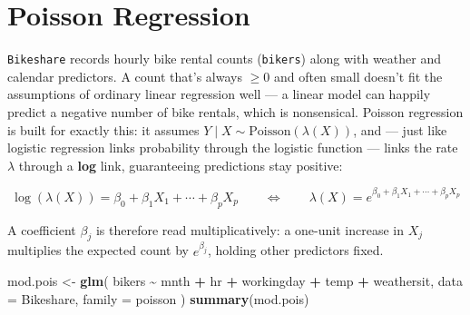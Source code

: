 \documentclass[
  11pt,
]{article}
\newenvironment{Shaded}{\begin{snugshade}}{\end{snugshade}}
\newcommand{\AttributeTok}[1]{\textcolor[rgb]{0.13,0.29,0.53}{#1}}
\newcommand{\FunctionTok}[1]{\textcolor[rgb]{0.13,0.29,0.53}{\textbf{#1}}}
\newcommand{\NormalTok}[1]{#1}
\newcommand{\OtherTok}[1]{\textcolor[rgb]{0.56,0.35,0.01}{#1}}
\newcommand{\SpecialCharTok}[1]{\textcolor[rgb]{0.81,0.36,0.00}{\textbf{#1}}}
\begin{document}
\section{Poisson Regression}\label{poisson-regression}

\texttt{Bikeshare} records hourly bike rental counts (\texttt{bikers})
along with weather and calendar predictors. A count that's always
\(\geq 0\) and often small doesn't fit the assumptions of ordinary
linear regression well --- a linear model can happily predict a negative
number of bike rentals, which is nonsensical. Poisson regression is
built for exactly this: it assumes
\(Y \mid X \sim \text{Poisson}(\lambda(X))\), and --- just like logistic
regression links probability through the logistic function --- links the
rate \(\lambda\) through a \textbf{log} link, guaranteeing predictions
stay positive:

\[
\log(\lambda(X)) = \beta_0 + \beta_1 X_1 + \cdots + \beta_p X_p
\qquad \Longleftrightarrow \qquad
\lambda(X) = e^{\beta_0 + \beta_1 X_1 + \cdots + \beta_p X_p}
\]

A coefficient \(\beta_j\) is therefore read multiplicatively: a one-unit
increase in \(X_j\) multiplies the expected count by \(e^{\beta_j}\),
holding other predictors fixed.

\begin{Shaded}
\begin{Highlighting}[]
\NormalTok{mod.pois }\OtherTok{\textless{}{-}} \FunctionTok{glm}\NormalTok{(}
\NormalTok{  bikers }\SpecialCharTok{\textasciitilde{}}\NormalTok{ mnth }\SpecialCharTok{+}\NormalTok{ hr }\SpecialCharTok{+}\NormalTok{ workingday }\SpecialCharTok{+}\NormalTok{ temp }\SpecialCharTok{+}\NormalTok{ weathersit,}
  \AttributeTok{data =}\NormalTok{ Bikeshare, }\AttributeTok{family =}\NormalTok{ poisson}
\NormalTok{)}
\FunctionTok{summary}\NormalTok{(mod.pois)}
\end{Highlighting}
\end{Shaded}
\end{document}
